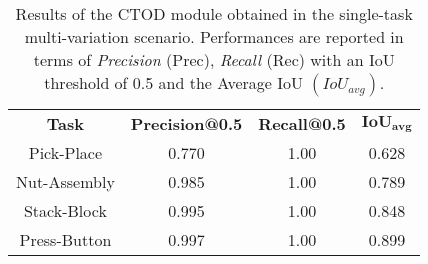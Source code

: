 




\begin{table}[t]
    \centering
    \caption{Results of the CTOD module obtained in the single-task multi-variation scenario. Performances are reported in terms of \textit{Precision} (Prec), \textit{Recall} (Rec) with an IoU threshold of 0.5 and the Average IoU $(IoU_{avg})$.}
    \label{table:ctod_single_task_performance}
    \begin{tabular}{|c|c|c|c|} 
    \hline
    \textbf{Task} & \textbf{Precision@0.5} & \textbf{Recall@0.5} & $\mathbf{IoU_{avg}}$ \\ 
    \hhline{|====|}
    Pick-Place & 0.770 & 1.00 & 0.628 \\ 
    \hline
    Nut-Assembly & 0.985 & 1.00 & 0.789 \\ 
    \hline
    Stack-Block & 0.995 & 1.00 & 0.848 \\ 
    \hline
    Press-Button & 0.997 & 1.00 & 0.899 \\
    \hline
    \end{tabular}
    \end{table}

